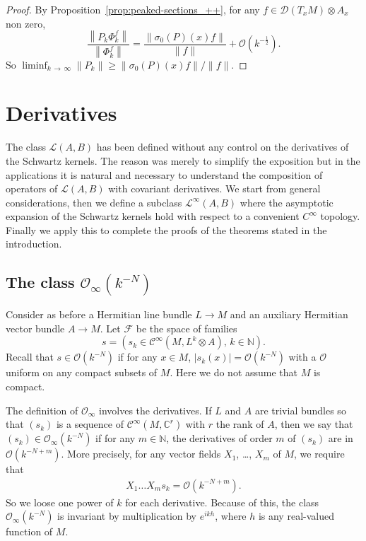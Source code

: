 \documentclass[10pt,a4paper]{article}
\theoremstyle{definition}
\numberwithin{equation}{section}
\newcommand{\N}{{\mathbb{N}}}
\newcommand{\C}{{\mathbb{C}}}
\newcommand{\si}{{\sigma}}
\newcommand{\Ci}{{\mathcal{C}}^{\infty}}
\newcommand{\bigo}{\mathcal{O}}
\newcommand{\biginf}{\mathcal{O}_{\infty}}
\newcommand{\D}{\mathcal{D}}
\newcommand{\lag}{\mathcal{L}}
\newcommand{\Fam}{\mathcal{F}}
\begin{document}
\begin{proof}
By Proposition~\ref{prop:peaked-sections_++}, for any $f \in \D (T_xM) \otimes A_x$ non zero,
\[
\frac{\left\| P_k \Phi_k^f\right\|}{\left\| \Phi_k^f\right\|} = \frac{ \| \si_0 (P) (x) f
\|}{\| f \| } + \bigo \left(k^{-\frac{1}{2}}\right).
\]
So $ \liminf_{k\,\rightarrow\,\infty} \| P_k \| \geqslant \| \si_0 (P) (x) f
\| / \| f \|$.
\end{proof}

\section{Derivatives} \label{sec:derivatives}

The class $\lag (A, B)$ has been defined without any control on the derivatives of the Schwartz kernels. The reason was merely to simplify the exposition but in the applications it is natural and necessary to understand the composition of operators of $\lag(A, B)$ with covariant derivatives. We start from general considerations, then we define a subclass $\lag ^{\infty}(A,B)$ where the asymptotic expansion of the Schwartz kernels hold with respect to a convenient $C^{\infty}$ topology. Finally we apply this to complete the proofs of the theorems stated in the introduction.
\subsection{The class \texorpdfstring{$\biginf (k^{-N})$}{O-infinity}}

Consider as before a Hermitian line bundle $L \rightarrow M$ and an auxiliary Hermitian vector bundle $A
\rightarrow M$. Let $\Fam$ be the space of families
\[
s= \left(s_k \in \Ci \left(M, L^k \otimes A\right)
,\, k \in \N\right).
\]
Recall that $s \in \bigo (k^{-N})$ if for any $x \in M$, $|s_k (x)| = \bigo (k^{-N})$ with a $\bigo $ uniform on any compact subsets of $M$. Here we do not assume that $M$ is compact.


The definition of $\biginf$ involves the derivatives. If $L$ and $A$ are trivial bundles so that $(s_k)$ is a sequence of $\Ci (M, \C^r)$ with $r$ the rank of $A$, then we say that $(s_k) \in \biginf (k^{-N})$ if for any $m \in
\N$, the derivatives of order $m$ of $(s_k)$ are in $\bigo (k^{-N+m})$. More precisely, for any vector fields $X_1$, \ldots, $X_m$ of $M$, we require that
\begin{gather}\label{eq:derk}
X_1 \ldots X_m s_k = \bigo \left(k^{-N+m}\right).
\end{gather}
So we loose one power of $k$ for each derivative. Because of this, the class $\biginf (k^{-N})$ is invariant by multiplication by $e^{ik h}$, where $h$ is any real-valued function of $M$.
\end{document}
